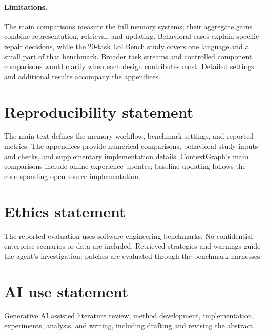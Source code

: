 \documentclass{article}
\begin{document}
\paragraph{Limitations.}
The main comparisons measure the full memory systems; their aggregate gains
combine representation, retrieval, and updating. Behavioral cases explain
specific repair decisions, while the 20-task LoLBench study covers one
language and a small part of that benchmark. Broader task streams and
controlled component comparisons would clarify when each design contributes
most. Detailed settings and additional results accompany the appendices.

\clearpage


\clearpage
\appendix

\clearpage

\clearpage

\clearpage




\clearpage

\section*{Reproducibility statement}
The main text defines the memory workflow, benchmark settings, and reported
metrics. The appendices provide numerical comparisons, behavioral-study
inputs and checks, and supplementary implementation details. ContextGraph's
main comparisons include online experience updates; baseline updating follows
the corresponding open-source implementation.
\section*{Ethics statement}
The reported evaluation uses software-engineering benchmarks. No confidential
enterprise scenarios or data are included. Retrieved strategies and warnings
guide the agent's investigation; patches are evaluated through the benchmark
harnesses.
\section*{AI use statement}
Generative AI assisted literature review, method development, implementation,
experiments, analysis, and writing, including drafting and revising the abstract.
\end{document}

